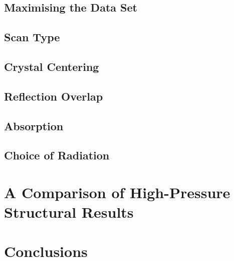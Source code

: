 \subsection{Maximising the Data Set}

\subsection{Scan Type}

\subsection{Crystal Centering}

\subsection{Reflection Overlap}

\subsection{Absorption}

\subsection{Choice of Radiation}

\section{A Comparison of High-Pressure Structural Results}

\section{Conclusions}

